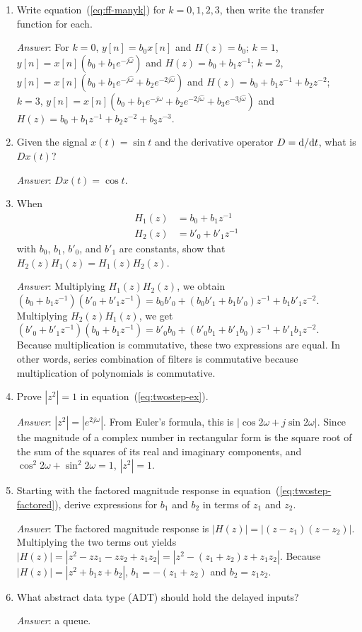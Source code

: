 \begin{enumerate}
\item Write equation~(\ref{eq:ff-manyk}) for $k=0, 1, 2, 3$, then
  write the transfer function for each.\label{it:ch3ex3}

  \textit{Answer}: For $k=0$, $y[n] = b_0 x[n]$ and $H(z) = b_0$;
  $k=1$, $y[n] = x[n] (b_0 + b_1 e^{-j\hat{\omega}})$ and $H(z) = b_0
  + b_1z^{-1}$; 
  $k=2$, $y[n] = x[n](b_0 + b_1 e^{-j\hat{\omega}} + b_2
  e^{-2j\hat{\omega}})$ and $H(z) = b_0 + b_1z^{-1} + b_2 z^{-2}$; 
  $k=3$, $y[n] = x[n](b_0 + b_1 e^{-j\hat{\omega}} + b_2
  e^{-2j\hat{\omega}} + b_3 e^{-3j\hat{\omega}})$ and $H(z) = b_0 +
  b_1z^{-1} + b_2 z^{-2} + b_3 z^{-3}$.

\item Given the signal $x(t) = \sin t$ and the derivative operator
  $D={\mathrm{d} }/{\mathrm{d} t}$, what is $Dx(t)$?\label{it:ch3ex4}

  \textit{Answer}: $Dx(t)=\cos t$.

\item When 
  \begin{align*}
    H_1(z) &= b_0 + b_1z^{-1}\\
    H_2(z) &= b'_0 + b'_1z^{-1}
  \end{align*}
  with $b_0$, $b_1$, $b'_0$, and $b'_1$ are constants, show that
  $H_2(z)H_1(z) = H_1(z)H_2(z)$.\label{it:ch3ex5}

  \textit{Answer}: Multiplying $H_1(z)H_2(z)$, we obtain
  $(b_0+b_1z^{-1})(b'_0+b'_1z^{-1})=b_0b'_0 + (b_0b'_1 +
  b_1b'_0)z^{-1} + b_1b'_1z^{-2}$. Multiplying $H_2(z)H_1(z)$, we get
  $(b'_0+b'_1z^{-1})(b_0+b_1z^{-1}) = b'_0b_0 + (b'_0b_1 +
  b'_1b_0)z^{-1} + b'_1b_1z^{-2}$.  Because multiplication is
  commutative, these two expressions are equal. In other words, series
  combination of filters is commutative because multiplication of
  polynomials is commutative.

\item Prove $|z^2|=1$ in
  equation~(\ref{eq:twostep-ex}).\label{it:ch3ex6}

  \textit{Answer}: $|z^2| = |e^{2j\omega}|$. From Euler's formula,
  this is $|\cos 2\omega + j\sin 2\omega|$. Since the magnitude of a
  complex number in rectangular form is the square root of the sum of
  the squares of its real and imaginary components, and $\cos^2
  2\omega + \sin^2 2\omega = 1$, $|z^2|=1$.

\item Starting with the factored magnitude response in
  equation~(\ref{eq:twostep-factored}), derive expressions for $b_1$
  and $b_2$ in terms of $z_1$ and $z_2$.\label{it:ch3ex7}

  \textit{Answer}: The factored magnitude response is
  $|H(z)|=|(z-z_1)(z-z_2)|$. Multiplying the two terms out yields
  $|H(z)|=|z^2 - zz_1 - zz_2 + z_1z_2|=|z^2 - (z_1+z_2)z +
  z_1z_2|$. Because $|H(z)|=|z^2 + b_1z + b_2|$,
  $b_1=-(z_1+z_2)$ and $b_2=z_1z_2$.

\item What abstract data type (ADT) should hold the delayed
  inputs?\label{it:ch3ex8}

  \textit{Answer}: a queue.

\end{enumerate}

